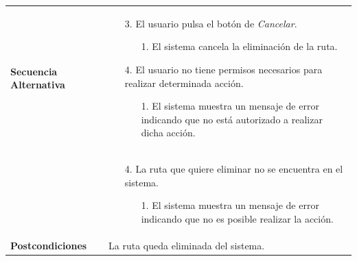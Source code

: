 \begin{longtable}{| p{4cm} | p{10cm} |}
\hline
\textbf{Secuencia Alternativa} &\mbox{}\par\vspace{-\baselineskip}
\begin{enumerate}[leftmargin=0.7cm, topsep=0.1cm]
\item[3.] El usuario pulsa el botón de \textit{Cancelar}.
	\begin{itemize}
	\item[1.] El sistema cancela la eliminación de la ruta.
	\end{itemize}
\item[4.] El usuario no tiene permisos necesarios para realizar determinada acción.
	\begin{itemize}
	\item[1.] El sistema muestra un mensaje de error indicando que no está autorizado a realizar dicha acción.
	\end{itemize}
\end{enumerate}
\\ &\mbox{}\par\vspace{-\baselineskip}
\begin{enumerate}[leftmargin=0.7cm, topsep=0.1cm]
\item[4.] La ruta que quiere eliminar no se encuentra en el sistema.
	\begin{itemize}
	\item[1.] El sistema muestra un mensaje de error indicando que no es posible realizar la acción.
	\end{itemize}
\end{enumerate}

\\

\hline
\textbf{Postcondiciones} & 
La ruta queda eliminada del sistema.\\
\hline
\end{longtable}


\newpage
